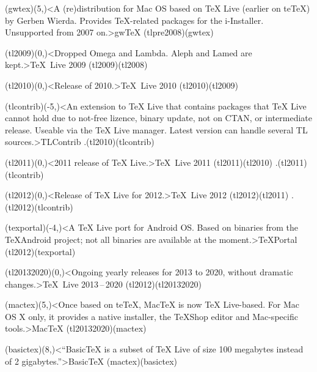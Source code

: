 {	\tonode[\histdistro](gwtex)(5,\layer)<A (re)distribution for Mac OS based on TeX Live (earlier on teTeX) by Gerben Wierda. Provides TeX-related packages for the i-Installer. Unsupported from 2007 on.>{gw\TeX}
	\todraw(tlpre2008)(gwtex)

	\steplayer

	\tonode(tl2009)(0,\layer)<Dropped Omega and Lambda. Aleph and Lamed are kept.>{\TeX\ Live 2009}
	\todraw(tl2009)(tl2008)
	\steplayer

	\tonode(tl2010)(0,\layer)<Release of 2010.>{\TeX\ Live 2010}
	\todraw(tl2010)(tl2009)


	\tonode(tlcontrib)(-5,\layer)<An extension to TeX Live that contains packages that TeX Live cannot hold due to not-free lizence, binary update, not on CTAN, or intermediate release. Useable via the TeX Live manager. Latest version can handle several TL sources.>{TLContrib}
	\todraw.(tl2010)(tlcontrib)
	\steplayer

	\tonode(tl2011)(0,\layer)<2011 release of TeX Live.>{\TeX~Live 2011}
	\todraw(tl2011)(tl2010)
	\todraw.(tl2011)(tlcontrib)

	\steplayer

	\tonode(tl2012)(0,\layer)<Release of TeX Live for 2012.>{\TeX~Live 2012}
	\todraw(tl2012)(tl2011)
	\todraw.(tl2012)(tlcontrib)

	\tonode(texportal)(-4,\layer)<A TeX Live port for Android OS. Based on binaries from the TeXAndroid project; not all binaries are available at the moment.>{\TeX Portal}
	\todraw(tl2012)(texportal)

\steplayer

	\tonode(tl20132020)(0,\layer)<Ongoing yearly releases for 2013 to 2020, without dramatic changes.>{\TeX~Live 2013\,–\,2020}
	\todraw(tl2012)(tl20132020)

	\tonode(mactex)(5,\layer)<Once based on teTeX, MacTeX is now TeX Live-based. For Mac OS X only, it provides a native installer, the TeXShop editor and Mac-specific tools.>{Mac\TeX}
	\todraw(tl20132020)(mactex)

	\tonode(basictex)(8,\layer)<“BasicTeX is a subset of TeX Live of size 100 megabytes instead of 2 gigabytes.”>{Basic\TeX}
	\todraw(mactex)(basictex)
}

